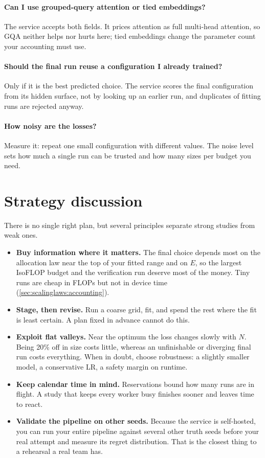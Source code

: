\paragraph{Can I use grouped-query attention or tied embeddings?} The service accepts both
fields. It prices attention as full multi-head attention, so GQA neither helps nor hurts here; tied
embeddings change the parameter count your accounting must use.

\paragraph{Should the final run reuse a configuration I already trained?} Only if it is the
best predicted choice. The service scores the final configuration from its hidden surface, not by
looking up an earlier run, and duplicates of fitting runs are rejected anyway.

\paragraph{How noisy are the losses?} Measure it: repeat one small configuration with different
 values. The noise level sets how much a single run can be trusted and how
many sizes per budget you need.

\section{Strategy discussion}\label{sec:proj3:strategy}

There is no single right plan, but several principles separate strong studies from weak ones.
\begin{itemize}
\item \textbf{Buy information where it matters.} The final choice depends most on the
      allocation law near the top of your fitted range and on $E$, so the largest IsoFLOP budget
      and the verification run deserve most of the money. Tiny runs are cheap in FLOPs but not in
      device time (\cref{sec:scalinglaws:accounting}).
\item \textbf{Stage, then revise.} Run a coarse grid, fit, and spend the rest where the fit is
      least certain. A plan fixed in advance cannot do this.
\item \textbf{Exploit flat valleys.} Near the optimum the loss changes slowly with $N$. Being
      20\% off in size costs little, whereas an unfinishable or diverging final run costs
      everything. When in doubt, choose robustness: a slightly smaller model, a conservative LR,
      a safety margin on runtime.
\item \textbf{Keep calendar time in mind.} Reservations bound how many runs are in flight. A
      study that keeps every worker busy finishes sooner and leaves time to react.
\item \textbf{Validate the pipeline on other seeds.} Because the service is self-hosted, you can
      run your entire pipeline against several other truth seeds before your real attempt and
      measure its regret distribution. That is the closest thing to a rehearsal a real team has.
\end{itemize}

